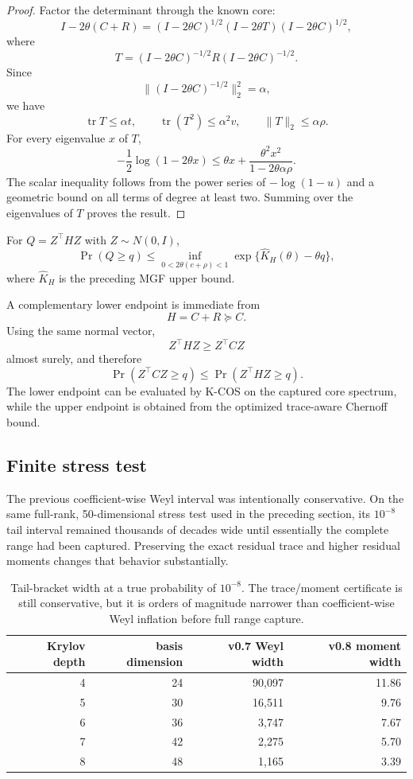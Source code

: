 \begin{proof}
Factor the determinant through the known core:
\[
I-2\theta(C+R)
=
(I-2\theta C)^{1/2}
(I-2\theta T)
(I-2\theta C)^{1/2},
\]
where
\[
T=(I-2\theta C)^{-1/2}
R
(I-2\theta C)^{-1/2}.
\]
Since
\[
\|(I-2\theta C)^{-1/2}\|_2^2=\alpha,
\]
we have
\[
\operatorname{tr}T\le\alpha t,
\qquad
\operatorname{tr}(T^2)\le\alpha^2v,
\qquad
\|T\|_2\le\alpha\rho.
\]
For every eigenvalue \(x\) of \(T\),
\[
-\frac12\log(1-2\theta x)
\le
\theta x
+
\frac{\theta^2x^2}
     {1-2\theta\alpha\rho}.
\]
The scalar inequality follows from the power series of \(-\log(1-u)\) and a
geometric bound on all terms of degree at least two.  Summing over the
eigenvalues of \(T\) proves the result.
\end{proof}

\begin{corollary}
For \(Q=Z^\top HZ\) with \(Z\sim N(0,I)\),
\[
\boxed{
\Pr(Q\ge q)
\le
\inf_{0<2\theta(c+\rho)<1}
\exp\{\widehat K_H(\theta)-\theta q\},
}
\]
where \(\widehat K_H\) is the preceding MGF upper bound.
\end{corollary}

A complementary lower endpoint is immediate from
\[
H=C+R\succeq C.
\]
Using the same normal vector,
\[
Z^\top HZ\ge Z^\top CZ
\]
almost surely, and therefore
\[
\boxed{
\Pr(Z^\top CZ\ge q)
\le
\Pr(Z^\top HZ\ge q).
}
\]
The lower endpoint can be evaluated by K-COS on the captured core spectrum,
while the upper endpoint is obtained from the optimized trace-aware Chernoff
bound.

\subsection{Finite stress test}

The previous coefficient-wise Weyl interval was intentionally conservative.
On the same full-rank, 50-dimensional stress test used in the preceding
section, its \(10^{-8}\) tail interval remained thousands of decades wide
until essentially the complete range had been captured.  Preserving the exact
residual trace and higher residual moments changes that behavior substantially.

\begin{table}[H]
\centering
\caption{Tail-bracket width at a true probability of \(10^{-8}\).  The
trace/moment certificate is still conservative, but it is orders of magnitude
narrower than coefficient-wise Weyl inflation before full range capture.}
\begin{tabular}{rrrr}
\toprule
Krylov depth & basis dimension & v0.7 Weyl width & v0.8 moment width\\
\midrule
4 & 24 & 90,097 & 11.86\\
5 & 30 & 16,511 & 9.76\\
6 & 36 & 3,747 & 7.67\\
7 & 42 & 2,275 & 5.70\\
8 & 48 & 1,165 & 3.39\\
\bottomrule
\end{tabular}
\end{table}

